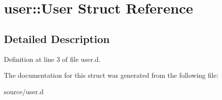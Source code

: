 \hypertarget{structuser_1_1User}{}\section{user\+:\+:User Struct Reference}
\label{structuser_1_1User}


\subsection{Detailed Description}


Definition at line 3 of file user.\+d.



The documentation for this struct was generated from the following file\+:\begin{DoxyCompactItemize}
\item 
source/user.\+d\end{DoxyCompactItemize}
